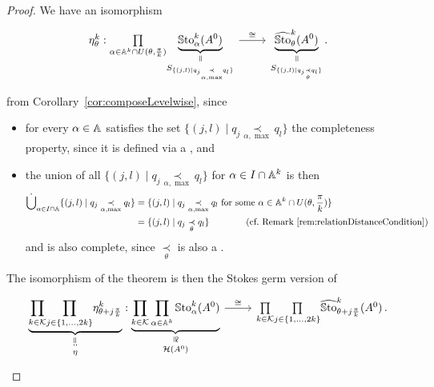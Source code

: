\begin{proof}
  We have an isomorphism
  \[ \begin{tikzcd}
    \eta_\theta^k:
    \underset{\alpha\in\A^k\cap U(\theta,\frac{\pi}{k})}\prod
    \underset{S_{\{(j,l)\mid q_j\underset{\alpha,\max}{\prec}q_l\}}}{%
      \underset{\text{\rotatebox[origin=c]{-90}{$=$}}}{\underbrace{%
          \SSto_\alpha^k(A^0)}}}
    \rar{\cong}&
    \underset{S_{\{(j,l) \mid q_j \underset{\theta}{\prec} q_l \}}}{%
      \underset{\text{\rotatebox[origin=c]{-90}{$=$}}}{\underbrace{%
          \hat\SSto_\theta^k(A^0)}}}
    \,.
  \end{tikzcd} \]
  from Corollary~\ref{cor:composeLevelwise}, since
  \begin{itemize}
    \item for every $\alpha\in\mathbb{A}$ satisfies the set
      $\{(j,l)\mid q_j\underset{\alpha,\max}{\prec}q_l\}$ the completeness
      property, since it is defined via a , and
    \item the union of all $\{(j,l)\mid q_j\underset{\alpha,\max}{\prec}q_l\}$
      for $\alpha\in I\cap\mathbb{A}^k$ is then
      \begin{align*}
        \dot\bigcup_{\alpha\in I\cap\mathbb{A}}
          \{(j,l)\mid q_j\underset{\alpha,\max}{\prec}q_l\}
          &=\{(j,l) \mid q_j \underset{\alpha,\max}{\prec} q_l
            \text{~for some~}\alpha\in\mathbb{A}^k\cap U(\theta,\frac{\pi}{k}) \}
        \\&= \{(j,l) \mid q_j \underset{\theta}{\prec} q_l \}
          \qquad\qquad\text{(cf.\ Remark~\ref{rem:relationDistanceCondition})}
      \end{align*}
      and is also complete, since $\underset{\theta}{\prec}$ is also a
      .
  \end{itemize}
  The isomorphism of the theorem is then the Stokes germ version of
  \[ \begin{tikzcd}
    \underset{\eta}{%
      \underset{\text{\rotatebox[origin=c]{90}{$:=$}}}{\underbrace{%
        \underset{k\in\cK}{\prod}\underset{j\in\{1,\dots,2k\}}{\prod}
        \eta_{\theta+j\frac{\pi}{k}}^k
    }}}:
    \underset{\cH(A^0)}{%
      \underset{\text{\rotatebox[origin=c]{-90}{$\cong$}}}{\underbrace{%
        \prod_{k\in\cK}\prod_{\alpha\in\A^k}\SSto_\alpha^k(A^0)}}}
    \rar{\cong}&
    \underset{k\in\cK}{\prod}\underset{j\in\{1,\dots,2k\}}{\prod}
    \hat\SSto_{\theta+j\frac{\pi}{k}}^k(A^0) \,.
  \end{tikzcd} \]
\end{proof}
